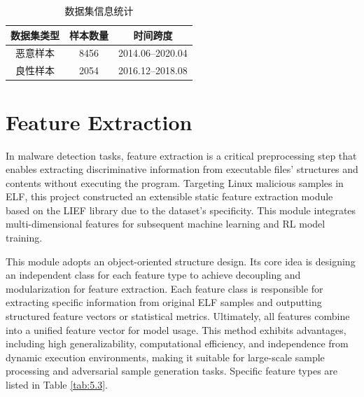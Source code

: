 \begin{table}[htbp]
	\centering
	\caption{数据集信息统计}
	\label{tab:5.2}
	\begin{tabular*}{0.9\textwidth}{@{\extracolsep{\fill}}ccc}
		\toprule
		数据集类型 & 样本数量 & 时间跨度 \\
		\midrule
		恶意样本 & 8456 & 2014.06--2020.04 \\
		良性样本 & 2054 & 2016.12--2018.08 \\
		\bottomrule
	\end{tabular*}
\end{table}


\section{Feature Extraction}

In malware detection tasks, feature extraction is a critical preprocessing step that enables extracting discriminative information from executable files' structures and contents without executing the program. Targeting Linux malicious samples in ELF, this project constructed an extensible static feature extraction module based on the LIEF library due to the dataset’s specificity. This module integrates multi-dimensional features for subsequent machine learning and RL model training.

This module adopts an object-oriented structure design. Its core idea is designing an independent class for each feature type to achieve decoupling and modularization for feature extraction. Each feature class is responsible for extracting specific information from original ELF samples and outputting structured feature vectors or statistical metrics. Ultimately, all features combine into a unified feature vector for model usage. This method exhibits advantages, including high generalizability, computational efficiency, and independence from dynamic execution environments, making it suitable for large-scale sample processing and adversarial sample generation tasks. Specific feature types are listed in Table \ref{tab:5.3}.  

